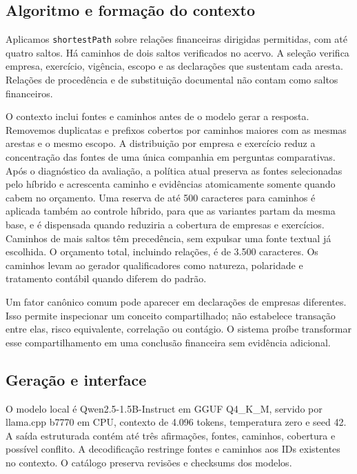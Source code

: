 \documentclass[conference]{IEEEtran}
\begin{document}
\subsection{Algoritmo e formação do contexto}

Aplicamos \texttt{shortestPath} sobre relações financeiras dirigidas permitidas, com até quatro saltos. Há caminhos de dois saltos verificados no acervo. A seleção verifica empresa, exercício, vigência, escopo e as declarações que sustentam cada aresta. Relações de procedência e de substituição documental não contam como saltos financeiros.

O contexto inclui fontes e caminhos antes de o modelo gerar a resposta. Removemos duplicatas e prefixos cobertos por caminhos maiores com as mesmas arestas e o mesmo escopo. A distribuição por empresa e exercício reduz a concentração das fontes de uma única companhia em perguntas comparativas. Após o diagnóstico da avaliação, a política atual preserva as fontes selecionadas pelo híbrido e acrescenta caminho e evidências atomicamente somente quando cabem no orçamento. Uma reserva de até 500 caracteres para caminhos é aplicada também ao controle híbrido, para que as variantes partam da mesma base, e é dispensada quando reduziria a cobertura de empresas e exercícios. Caminhos de mais saltos têm precedência, sem expulsar uma fonte textual já escolhida. O orçamento total, incluindo relações, é de 3.500 caracteres. Os caminhos levam ao gerador qualificadores como natureza, polaridade e tratamento contábil quando diferem do padrão.

Um fator canônico comum pode aparecer em declarações de empresas diferentes. Isso permite inspecionar um conceito compartilhado; não estabelece transação entre elas, risco equivalente, correlação ou contágio. O sistema proíbe transformar esse compartilhamento em uma conclusão financeira sem evidência adicional.

\subsection{Geração e interface}

O modelo local é Qwen2.5-1.5B-Instruct em GGUF Q4\_K\_M, servido por llama.cpp b7770 em CPU, contexto de 4.096 tokens, temperatura zero e seed 42. A saída estruturada contém até três afirmações, fontes, caminhos, cobertura e possível conflito. A decodificação restringe fontes e caminhos aos IDs existentes no contexto. O catálogo preserva revisões e checksums dos modelos.
\end{document}
